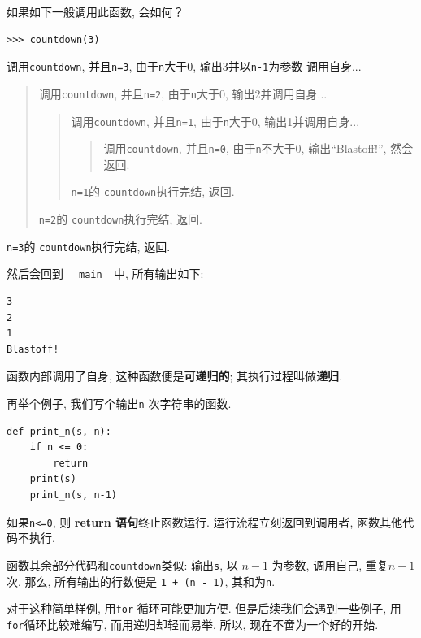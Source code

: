 \documentclass[10pt]{book}
\begin{document}
如果如下一般调用此函数, 会如何？

\begin{verbatim}
>>> countdown(3)
\end{verbatim}
%

调用{\tt countdown}, 并且{\tt n=3}, 由于{\tt n}大于0, 输出3并以{\tt n-1}为参数
调用自身...

\begin{quote}
调用{\tt countdown},  并且{\tt n=2}, 由于{\tt n}大于0, 输出2并调用自身...

\begin{quote}
调用{\tt countdown},  并且{\tt n=1}, 由于{\tt n}大于0, 输出1并调用自身...

\begin{quote}
调用{\tt countdown},  并且{\tt n=0}, 由于{\tt n}不大于0, 输出``Blastoff!'', 
然会返回. 
\end{quote}

{\tt n=1}的 {\tt countdown}执行完结, 返回. 
\end{quote}

{\tt n=2}的 {\tt countdown}执行完结, 返回. 
\end{quote}

{\tt n=3}的 {\tt countdown}执行完结, 返回. 

然后会回到 \verb"__main__"中,  所有输出如下:

\begin{verbatim}
3
2
1
Blastoff!
\end{verbatim}
%
函数内部调用了自身, 这种函数便是{\bf 可递归的};
其执行过程叫做{\bf 递归}.

再举个例子, 我们写个输出{\tt n} 次字符串的函数.

\begin{verbatim}
def print_n(s, n):
    if n <= 0:
        return
    print(s)
    print_n(s, n-1)
\end{verbatim}
%
如果{\tt n<=0}, 则 {\bf return 语句}终止函数运行. 
运行流程立刻返回到调用者, 函数其他代码不执行. 

函数其余部分代码和{\tt countdown}类似: 
输出{\tt s},  以 $n-1$ 为参数, 调用自己, 重复$n-1$次. 
那么, 所有输出的行数便是 {\tt 1 + (n - 1)},  其和为{\tt n}. 

对于这种简单样例, 用{\tt for} 循环可能更加方便. 
但是后续我们会遇到一些例子, 用{\tt for}循环比较难编写, 而用递归却轻而易举, 
所以, 现在不啻为一个好的开始. 
\end{document}
